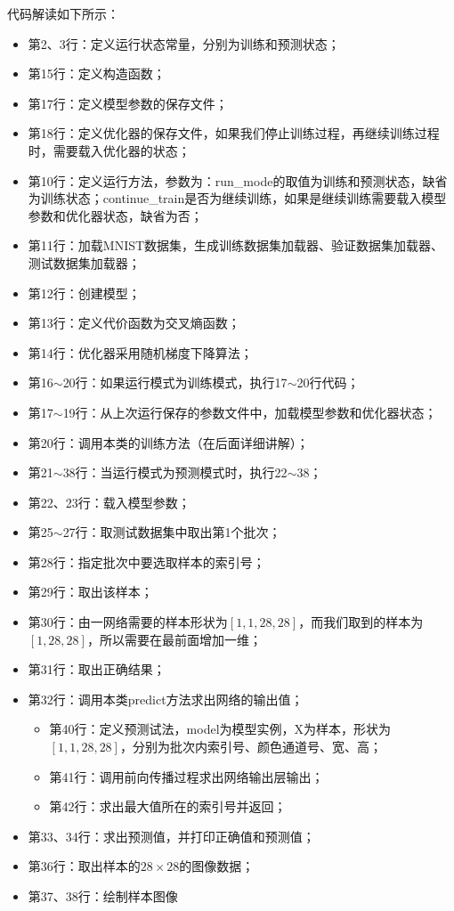 \documentclass[UTF8]{article}
\begin{document}
代码解读如下所示：
\begin{itemize}
\item 第2、3行：定义运行状态常量，分别为训练和预测状态；
\item 第15行：定义构造函数；
\item 第17行：定义模型参数的保存文件；
\item 第18行：定义优化器的保存文件，如果我们停止训练过程，再继续训练过程时，需要载入优化器的状态；
\item 第10行：定义运行方法，参数为：run\_mode的取值为训练和预测状态，缺省为训练状态；continue\_train是否为继续训练，如果是继续训练需要载入模型参数和优化器状态，缺省为否；
\item 第11行：加载MNIST数据集，生成训练数据集加载器、验证数据集加载器、测试数据集加载器；
\item 第12行：创建模型；
\item 第13行：定义代价函数为交叉熵函数；
\item 第14行：优化器采用随机梯度下降算法；
\item 第16$\sim$20行：如果运行模式为训练模式，执行17$\sim$20行代码；
\item 第17$\sim$19行：从上次运行保存的参数文件中，加载模型参数和优化器状态；
\item 第20行：调用本类的训练方法（在后面详细讲解）；
\item 第21$\sim$38行：当运行模式为预测模式时，执行22$\sim$38；
\item 第22、23行：载入模型参数；
\item 第25$\sim$27行：取测试数据集中取出第1个批次；
\item 第28行：指定批次中要选取样本的索引号；
\item 第29行：取出该样本；
\item 第30行：由一网络需要的样本形状为$[1,1,28,28]$，而我们取到的样本为$[1,28,28]$，所以需要在最前面增加一维；
\item 第31行：取出正确结果；
\item 第32行：调用本类predict方法求出网络的输出值；
	\begin{itemize}
	\item 第40行：定义预测试法，model为模型实例，X为样本，形状为$[1,1,28,28]$，分别为批次内索引号、颜色通道号、宽、高；
	\item 第41行：调用前向传播过程求出网络输出层输出；
	\item 第42行：求出最大值所在的索引号并返回；
	\end{itemize}
\item 第33、34行：求出预测值，并打印正确值和预测值；
\item 第36行：取出样本的$28 \times 28$的图像数据；
\item 第37、38行：绘制样本图像
\end{itemize}
\end{document}
